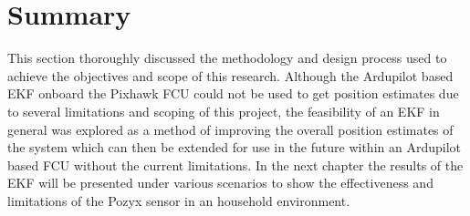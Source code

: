 \section{Summary}
This section thoroughly discussed the methodology and design process used to achieve the objectives and scope of this research.
Although the Ardupilot based EKF onboard the Pixhawk FCU could not be used to get position estimates due to several
limitations and scoping of this project, the feasibility of an EKF in general was explored as a method of improving the
overall position estimates of the system which can then be extended for use in the future within an Ardupilot based FCU without the current limitations.
In the next chapter the results of the EKF will be presented under various scenarios to show the effectiveness and limitations of the Pozyx sensor in an household environment.
